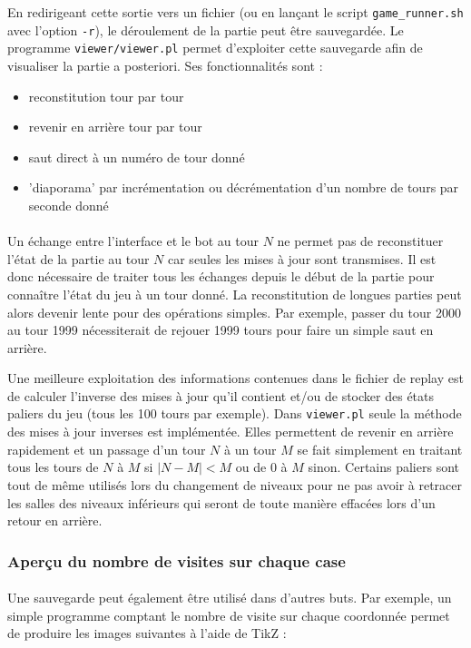 \documentclass[a4paper,12pt]{article}
\begin{document}
En redirigeant cette sortie vers un fichier (ou en lançant le script
\verb!game_runner.sh! avec l'option \verb!-r!), le déroulement de la partie
peut être sauvegardée.  Le programme \verb!viewer/viewer.pl! permet
d'exploiter cette sauvegarde afin de visualiser la partie a posteriori. Ses fonctionnalités sont :
\begin{itemize}
	\item reconstitution tour par tour
	\item revenir en arrière tour par tour
	\item saut direct à un numéro de tour donné
	\item 'diaporama' par incrémentation ou décrémentation d'un nombre de
		tours par seconde donné
\end{itemize}

\paragraph{}
Un échange entre l'interface et le bot au tour $N$ ne permet pas de
reconstituer l'état de la partie au tour $N$ car seules les mises à jour sont
transmises. Il est donc nécessaire de traiter tous les échanges depuis le
début de la partie pour connaître l'état du jeu à un tour donné. La
reconstitution de longues parties peut alors devenir lente pour des opérations
simples. Par exemple, passer du tour 2000 au tour 1999 nécessiterait de
rejouer 1999 tours pour faire un simple saut en arrière.

Une meilleure exploitation des informations contenues dans le fichier de
replay est de calculer l'inverse des mises à jour qu'il contient et/ou de
stocker des états paliers du jeu (tous les 100 tours par exemple). Dans
\verb!viewer.pl! seule la méthode des mises à jour inverses est implémentée.
Elles permettent de revenir en arrière rapidement et un passage d'un tour $N$
à un tour $M$ se fait simplement en traitant tous les tours de $N$ à $M$ si
$|N-M| < M$ ou de $0$ à $M$ sinon. Certains paliers sont tout de même utilisés
lors du changement de niveaux pour ne pas avoir à retracer les salles des
niveaux inférieurs qui seront de toute manière effacées lors d'un retour en
arrière.

\subsubsection{Aperçu du nombre de visites sur chaque case}

\paragraph{}
Une sauvegarde peut également être utilisé dans d'autres buts.
Par exemple, un simple programme comptant le nombre de visite sur chaque
coordonnée permet de produire les images suivantes à l'aide de TikZ :
\end{document}
